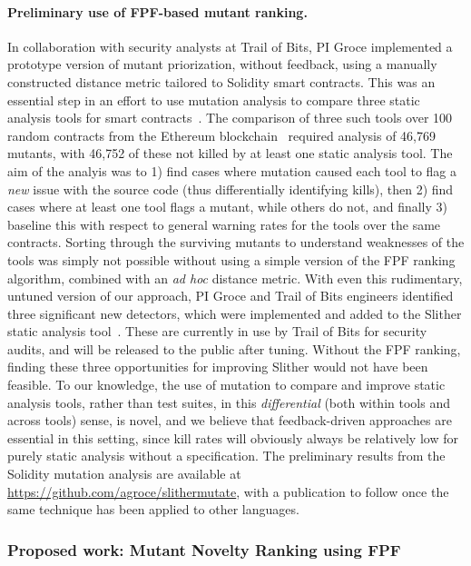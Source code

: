 \paragraph{Preliminary use of FPF-based mutant ranking.} In collaboration with security analysts at Trail of Bits, PI Groce
implemented a prototype version of mutant priorization, without
feedback, using a manually constructed distance metric tailored to
Solidity smart contracts.  This was an essential step in an effort to
use mutation analysis to compare three static analysis tools for smart
contracts~\cite{slitherpaper,sc:smartcheck,securify}.  The comparison of three such tools over 100 random contracts
from the Ethereum blockchain~\cite{buterin2013whitepaper,wood2014yellow} required analysis of 46,769 mutants, with
46,752 of these not killed by at least one static analysis tool.  The
aim of the analyis was to 1) find cases where mutation caused each
tool to flag a \emph{new} issue with the source code (thus
differentially identifying kills), then 2) find cases where at
least one tool flags a mutant, while others do not, and finally 3) baseline
this with respect to general warning rates for the tools over the same contracts.
Sorting through the surviving mutants to understand weaknesses of the
tools was simply not possible without using a simple version of the
FPF ranking algorithm, combined with an \emph{ad hoc} distance
metric.  With even this rudimentary, untuned version of our approach,
PI Groce and Trail of Bits engineers identified three significant new
detectors, which were implemented and added to the Slither static
analysis tool~\cite{slitherpaper}.  These are currently in use by Trail of Bits for
security audits, and will be released to the public after tuning.  Without the FPF ranking, finding these three
opportunities for improving Slither would not have been feasible.  To
our knowledge, the use of mutation to compare and improve static
analysis tools, rather than test suites, in this \emph{differential}
(both within tools and across tools) sense, is novel, and we believe that
feedback-driven approaches are essential in this setting, since kill
rates will obviously always be relatively low for purely static
analysis without a specification.  The preliminary results from the
Solidity mutation analysis are available at
\url{https://github.com/agroce/slithermutate}, with a publication to
follow once the same technique has been applied to other languages.

\subsubsection{Proposed work: Mutant Novelty Ranking using FPF}

